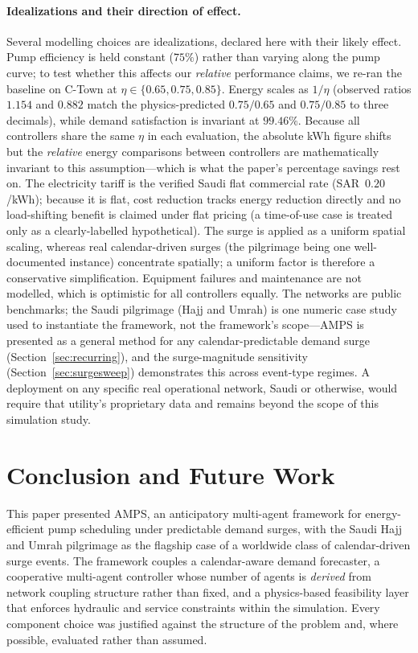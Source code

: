 \documentclass[11pt,a4paper]{article}
\begin{document}
\paragraph{Idealizations and their direction of effect.} Several modelling
choices are idealizations, declared here with their likely effect. Pump
efficiency is held constant ($75\%$) rather than varying along the pump curve;
to test whether this affects our \emph{relative} performance claims, we re-ran
the baseline on C-Town at $\eta\in\{0.65,0.75,0.85\}$. Energy scales as $1/\eta$
(observed ratios $1.154$ and $0.882$ match the physics-predicted $0.75/0.65$ and
$0.75/0.85$ to three decimals), while demand satisfaction is invariant at
$99.46\%$. Because all controllers share the same $\eta$ in each evaluation, the
absolute kWh figure shifts but the \emph{relative} energy comparisons between
controllers are mathematically invariant to this assumption---which is what the
paper's percentage savings rest on. The electricity tariff is the verified
Saudi flat commercial rate (SAR~$0.20$/kWh); because it is flat, cost reduction
tracks energy reduction directly and no load-shifting benefit is claimed under
flat pricing (a time-of-use case is treated only as a clearly-labelled
hypothetical). The surge is applied as a uniform spatial scaling, whereas real
calendar-driven surges (the pilgrimage being one well-documented instance)
concentrate spatially; a uniform factor is therefore a conservative simplification.
Equipment failures and maintenance are not modelled, which is optimistic for all
controllers equally. The networks are public benchmarks; the Saudi pilgrimage
(Hajj and Umrah) is one numeric case study used to instantiate the framework,
not the
framework's scope---AMPS is presented as a general method for any
calendar-predictable demand surge (Section~\ref{sec:recurring}), and the
surge-magnitude sensitivity (Section~\ref{sec:surgesweep}) demonstrates this
across event-type regimes. A deployment on any specific real operational
network, Saudi or otherwise, would require that utility's proprietary data and
remains beyond the scope of this simulation study.

\section{Conclusion and Future Work}
\label{sec:conclusion}
This paper presented AMPS, an anticipatory multi-agent framework for
energy-efficient pump scheduling under predictable demand surges, with the Saudi
Hajj and Umrah pilgrimage as the flagship case of a worldwide class of
calendar-driven surge events. The framework couples a calendar-aware demand
forecaster, a cooperative multi-agent controller whose number of agents is
\emph{derived} from network coupling structure rather than fixed, and a
physics-based feasibility layer that enforces hydraulic and service constraints
within the simulation. Every component choice was justified against the
structure of the problem and, where possible, evaluated rather than assumed.
\end{document}
